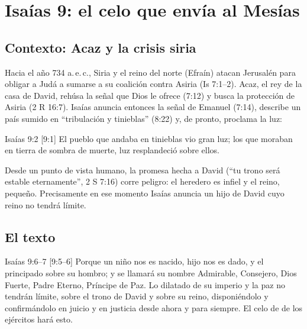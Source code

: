 
\section{Isaías 9: el celo que envía al Mesías}

\subsection{Contexto: Acaz y la crisis siria}
Hacia el año 734 a.\,e.\,c., Siria y el reino del norte (Efraín) atacan Jerusalén para obligar a Judá a sumarse a su coalición contra Asiria (Is 7:1--2). Acaz, el rey de la casa de David, rehúsa la señal que Dios le ofrece (7:12) y busca la protección de Asiria (2 R 16:7). Isaías anuncia entonces la señal de Emanuel (7:14), describe un país sumido en ``tribulación y tinieblas'' (8:22) y, de pronto, proclama la luz:

\begin{verso}{Isaías 9:2 [9:1]}
El pueblo que andaba en tinieblas vio gran luz; los que moraban en tierra de sombra de muerte, luz resplandeció sobre ellos.
\end{verso}

Desde un punto de vista humano, la promesa hecha a David (``tu trono será estable eternamente'', 2 S 7:16) corre peligro: el heredero es infiel y el reino, pequeño. Precisamente en ese momento Isaías anuncia un hijo de David cuyo reino no tendrá límite.

\subsection{El texto}
\begin{verso}{Isaías 9:6–7 [9:5–6]}
Porque un niño nos es nacido, hijo nos es dado, y el principado sobre su hombro; y se llamará su nombre Admirable, Consejero, Dios Fuerte, Padre Eterno, Príncipe de Paz. Lo dilatado de su imperio y la paz no tendrán límite, sobre el trono de David y sobre su reino, disponiéndolo y confirmándolo en juicio y en justicia desde ahora y para siempre. El celo de \SENOR{} de los ejércitos hará esto.
\end{verso}

